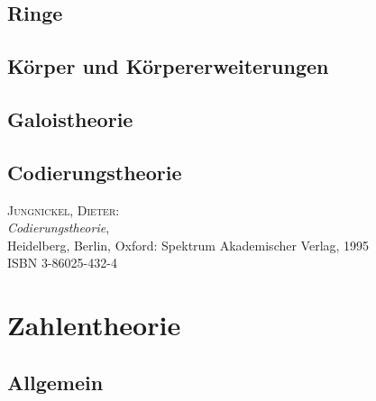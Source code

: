 \subsection{Ringe}

\subsection{K\"orper und K\"orpererweiterungen}

\subsection{Galoistheorie}

\subsection{Codierungstheorie}

\begin{description}

\item \textsc{Jungnickel, Dieter}: \\
\textit{Codierungstheorie}, \\
Heidelberg, Berlin, Oxford: Spektrum Akademischer Verlag, 1995 \\
ISBN 3-86025-432-4

\end{description}


\section{Zahlentheorie} 

\subsection{Allgemein}

